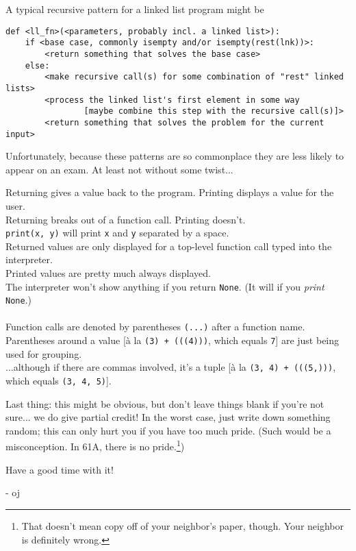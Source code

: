 \documentclass[twoside]{article}
\begin{document}
\begin{enumerate}
A typical recursive pattern for a linked list program might be

\begin{lstlisting}
def <ll_fn>(<parameters, probably incl. a linked list>):
    if <base case, commonly isempty and/or isempty(rest(lnk))>:
        <return something that solves the base case>
    else:
        <make recursive call(s) for some combination of "rest" linked lists>
        <process the linked list's first element in some way
                [maybe combine this step with the recursive call(s)]>
        <return something that solves the problem for the current input>
\end{lstlisting}

Unfortunately, because these patterns are so commonplace they are less likely to appear on an exam. At least not without some twist...


Returning gives a value back to the program. Printing displays a value for the user.\\
Returning breaks out of a function call. Printing doesn't.\\
\texttt{print(x, y)} will print \texttt{x} and \texttt{y} separated by a space.\\
Returned values are only displayed for a top-level function call typed into the interpreter.\\
Printed values are pretty much always displayed.\\
The interpreter won't show anything if you return \texttt{None}. (It will if you \textit{print} \texttt{None}.)\\\\
Function calls are denoted by parentheses \texttt{(...)} after a function name.\\
Parentheses around a value [\`{a} la \texttt{(3) + (((4)))}, which equals \texttt{7}] are just being used for grouping.\\
...although if there are commas involved, it's a tuple [\`{a} la \texttt{(3, 4) + (((5,)))}, which equals \texttt{(3, 4, 5)}].

\end{enumerate}

Last thing: this might be obvious, but don't leave things blank if you're not sure... we do give partial credit! In the worst case, just write down something random; this can only hurt you if you have too much pride. (Such would be a misconception. In 61A, there is no pride.\footnote{\:\:That doesn't mean copy off of your neighbor's paper, though. Your neighbor is definitely wrong.})

Have a good time with it!

- oj
\end{document}
